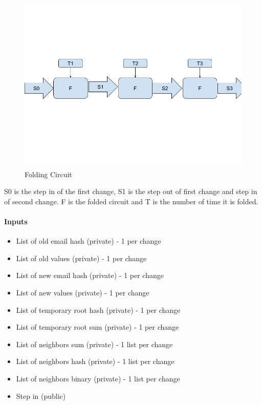 \begin{figure}[H]
   \centering
   \includegraphics[width=130mm]{FoldingCircuit.png}
   \caption{Folding Circuit}
   \label{overflow}
   \end{figure}

S0 is the step in of the first change, S1 is the step out of first change and step in of second change. F is the folded circuit
and T is the number of time it is folded.

\paragraph{Inputs}
\begin{itemize}
   \item List of old email hash (private) - 1 per change
   \item List of old values (private) - 1 per change
   \item List of new email hash (private) - 1 per change
   \item List of new values (private) - 1 per change
   \item List of temporary root hash (private) - 1 per change
   \item List of temporary root sum (private) - 1 per change
   \item List of neighbors sum (private) - 1 list per change
   \item List of neighbors hash (private) - 1 list per change
   \item List of neighbors binary (private) - 1 list per change
   \item Step in (public)
   \end{itemize}

